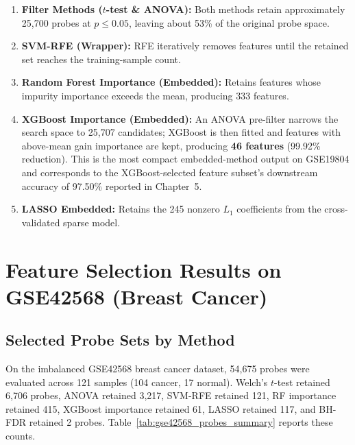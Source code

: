 \begin{enumerate}
    \item \textbf{Filter Methods ($t$-test \& ANOVA):} Both methods retain approximately 25,700 probes at $p \leq 0.05$, leaving about 53\% of the original probe space.

    \item \textbf{SVM-RFE (Wrapper):} RFE iteratively removes features until the retained set reaches the training-sample count.

    \item \textbf{Random Forest Importance (Embedded):} Retains features whose impurity importance exceeds the mean, producing 333 features.

    \item \textbf{XGBoost Importance (Embedded):} An ANOVA pre-filter narrows the search space to 25,707 candidates; XGBoost is then fitted and features with above-mean gain importance are kept, producing \textbf{46 features} (99.92\% reduction). This is the most compact embedded-method output on GSE19804 and corresponds to the XGBoost-selected feature subset's downstream accuracy of 97.50\% reported in Chapter~5.

    \item \textbf{LASSO Embedded:} Retains the 245 nonzero $L_1$ coefficients from the cross-validated sparse model.
\end{enumerate}

\section{Feature Selection Results on GSE42568 (Breast Cancer)}

\subsection{Selected Probe Sets by Method}

On the imbalanced GSE42568 breast cancer dataset, 54,675 probes were evaluated across 121 samples (104 cancer, 17 normal). Welch's $t$-test retained 6,706 probes, ANOVA retained 3,217, SVM-RFE retained 121, RF importance retained 415, XGBoost importance retained 61, LASSO retained 117, and BH-FDR retained 2 probes. Table~\ref{tab:gse42568_probes_summary} reports these counts.

